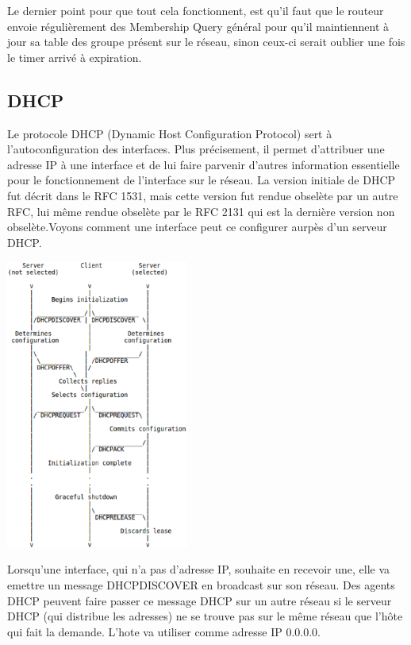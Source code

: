 Le dernier point pour que tout cela fonctionnent, est qu'il faut que le routeur envoie
régulièrement des Membership Query général pour qu'il maintiennent à jour sa table des
groupe présent sur le réseau, sinon ceux-ci serait oublier une fois le timer arrivé à expiration.

\subsection{DHCP}
Le protocole DHCP (Dynamic Host Configuration Protocol) sert à l'autoconfiguration
des interfaces. Plus précisement, il  permet d'attribuer une adresse IP à une
interface et de lui faire parvenir d'autres information essentielle pour le
fonctionnement de l'interface sur le réseau. La version initiale de DHCP fut décrit
dans le RFC 1531\cite{url-RFC-DHCP1}, mais cette version fut rendue obselète par un autre
RFC, lui même rendue obselète par le RFC 2131\cite{url-RFC-DHCP2} qui est la dernière version non
obselète.Voyons comment une interface peut ce configurer aurpès d'un serveur DHCP.

\includegraphics[width=6cm]{./pics/timeline_dhcp.eps}

Lorsqu'une interface, qui n'a pas d'adresse IP, souhaite en recevoir une, elle
va emettre un message DHCPDISCOVER en broadcast sur son réseau. Des agents DHCP
peuvent faire passer
ce message DHCP sur un autre réseau si le serveur DHCP (qui distribue les
adresses) ne se trouve pas sur le même réseau que l'hôte qui fait la demande.
L'hote va utiliser comme adresse IP 0.0.0.0.

